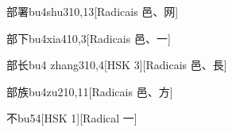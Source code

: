 \begin{entry}{部署}{bu4shu3}{10,13}[Radicais ⾢、⽹]
\end{entry}

\begin{entry}{部下}{bu4xia4}{10,3}[Radicais ⾢、⼀]
\end{entry}

\begin{entry}{部长}{bu4 zhang3}{10,4}[HSK 3][Radicais ⾢、⾧]
\end{entry}

\begin{entry}{部族}{bu4zu2}{10,11}[Radicais ⾢、⽅]
\end{entry}

\begin{entry}{不}{bu5}{4}[HSK 1][Radical ⼀]
\end{entry}


